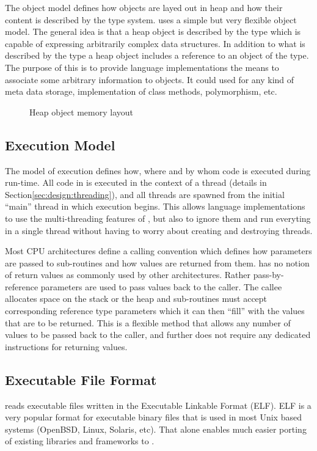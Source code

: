The object model defines how objects are layed out in heap and how their content
is described by the type system. \thename{} uses a simple but very flexible
object model. The general idea is that a heap object is described by the
 type which is capable of expressing arbitrarily complex data
structures. In addition to what is described by the type a heap object includes
a reference to an object of the  type. The purpose of this is to
provide language implementations the means to associate some arbitrary
information to objects. It could used for any kind of meta data storage,
implementation of class methods, polymorphism, etc.

\begin{figure}[H]
  \centering
  
  \caption{Heap object memory layout}
  \label{fig:design:heap-object-layout}
\end{figure}

\subsection{Execution Model}
The model of execution defines how, where and by whom code is executed during
run-time. All code in \thename{} is executed in the context of a thread (details
in Section\ref{sec:design:threading}), and all threads are spawned from the
initial ``main'' thread in which execution begins. This allows language
implementations to use the multi-threading features of \thename{}, but also to
ignore them and run everyting in a single thread without having to worry about
creating and destroying threads.

Most CPU architectures define a calling convention which defines how parameters
are passed to sub-routines and how values are returned from them. \thename{} has
no notion of return values as commonly used by other architectures. Rather
pass-by-reference parameters are used to pass values back to the caller. The
callee allocates space on the stack or the heap and sub-routines must accept
corresponding reference type parameters which it can then ``fill'' with the
values that are to be returned. This is a flexible method that allows any number
of values to be passed back to the caller, and further does not require any
dedicated instructions for returning values.

\subsection{Executable File Format}
\thename{} reads executable files written in the Executable Linkable Format
(ELF). ELF is a very popular format for executable binary files that is used in
most Unix based systems (OpenBSD, Linux, Solaris, etc\cite{NEEDED}). That alone
enables much easier porting of existing libraries and frameworks to
\thename{}.

